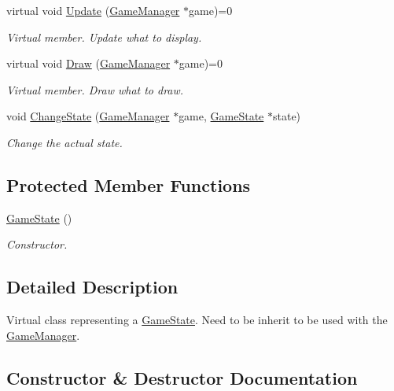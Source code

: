 \begin{DoxyCompactItemize}
virtual void \mbox{\hyperlink{classsfmlbe_1_1_game_state_ad3a1e8eb5d0598af841e0095033fa470}{Update}} (\mbox{\hyperlink{classsfmlbe_1_1_game_manager}{Game\+Manager}} $\ast$game)=0
\begin{DoxyCompactList}\small\item\em Virtual member. Update what to display. \end{DoxyCompactList}\item 
virtual void \mbox{\hyperlink{classsfmlbe_1_1_game_state_aa0b979c5694e117334eff4d3c1d25908}{Draw}} (\mbox{\hyperlink{classsfmlbe_1_1_game_manager}{Game\+Manager}} $\ast$game)=0
\begin{DoxyCompactList}\small\item\em Virtual member. Draw what to draw. \end{DoxyCompactList}\item 
void \mbox{\hyperlink{classsfmlbe_1_1_game_state_abb4f5e979d3c3fa56de67b302c3ac4b7}{Change\+State}} (\mbox{\hyperlink{classsfmlbe_1_1_game_manager}{Game\+Manager}} $\ast$game, \mbox{\hyperlink{classsfmlbe_1_1_game_state}{Game\+State}} $\ast$state)
\begin{DoxyCompactList}\small\item\em Change the actual state. \end{DoxyCompactList}\end{DoxyCompactItemize}
\subsection*{Protected Member Functions}
\begin{DoxyCompactItemize}
\item 
\mbox{\hyperlink{classsfmlbe_1_1_game_state_aef1ebb189af7c23e0e6297ac0c8d72d1}{Game\+State}} ()
\begin{DoxyCompactList}\small\item\em Constructor. \end{DoxyCompactList}\end{DoxyCompactItemize}


\subsection{Detailed Description}
Virtual class representing a \mbox{\hyperlink{classsfmlbe_1_1_game_state}{Game\+State}}. Need to be inherit to be used with the \mbox{\hyperlink{classsfmlbe_1_1_game_manager}{Game\+Manager}}. 

\subsection{Constructor \& Destructor Documentation}
\mbox{\label{classsfmlbe_1_1_game_state_aef1ebb189af7c23e0e6297ac0c8d72d1}} 
